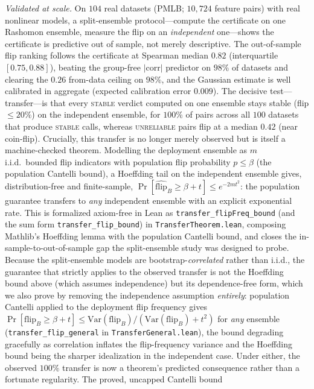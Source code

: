 \documentclass[11pt,a4paper]{article}
\begin{document}
\emph{Validated at scale.}  On $104$ real datasets (PMLB; $10{,}724$ feature pairs) with real
nonlinear models, a split-ensemble protocol---compute the certificate on one Rashomon ensemble,
measure the flip on an \emph{independent} one---shows the certificate is predictive out of sample,
not merely descriptive.  The out-of-sample flip ranking follows the certificate at Spearman median
$0.82$ (interquartile $[0.75,0.88]$), beating the group-free $|\text{corr}|$ predictor on $98\%$ of
datasets and clearing the $0.26$ from-data ceiling on $98\%$, and the Gaussian estimate is well
calibrated in aggregate (expected calibration error $0.009$).  The decisive test---transfer---is that every \textsc{stable} verdict computed on
one ensemble stays stable (flip $\leq 20\%$) on the independent ensemble, for $100\%$ of pairs across
all $100$ datasets that produce \textsc{stable} calls, whereas \textsc{unreliable} pairs flip at a
median $0.42$ (near coin-flip).  Crucially, this transfer is no longer merely observed but is itself
a machine-checked theorem.  Modelling the deployment ensemble as $m$ i.i.d.\ bounded flip indicators
with population flip probability $p \leq \beta$ (the population Cantelli bound), a Hoeffding tail on
the independent ensemble gives, distribution-free and finite-sample,
$\Pr[\widehat{\mathrm{flip}}_B \geq \beta + t] \leq e^{-2mt^2}$: the population guarantee transfers to
\emph{any} independent ensemble with an explicit exponential rate.  This is formalized axiom-free in
Lean as \texttt{transfer\_flipFreq\_bound} (and the sum form \texttt{transfer\_flip\_bound}) in
\texttt{TransferTheorem.lean}, composing Mathlib's Hoeffding lemma with the population Cantelli bound,
and closes the in-sample-to-out-of-sample gap the split-ensemble study was designed to probe.
Because the split-ensemble models are bootstrap-\emph{correlated} rather than i.i.d., the guarantee
that strictly applies to the observed transfer is not the Hoeffding bound above (which assumes
independence) but its dependence-free form, which we also prove by removing the independence
assumption \emph{entirely}: population Cantelli applied to the deployment flip frequency gives
$\Pr[\mathrm{flip}_B \geq \beta + t] \leq \mathrm{Var}(\mathrm{flip}_B)/(\mathrm{Var}(\mathrm{flip}_B)+t^2)$
for \emph{any} ensemble (\texttt{transfer\_flip\_general} in \texttt{TransferGeneral.lean}), the bound
degrading gracefully as correlation inflates the flip-frequency variance and the Hoeffding bound being
the sharper idealization in the independent case.  Under either, the observed $100\%$ transfer is now
a theorem's predicted consequence rather than a fortunate regularity.  The proved, uncapped Cantelli bound
\end{document}
